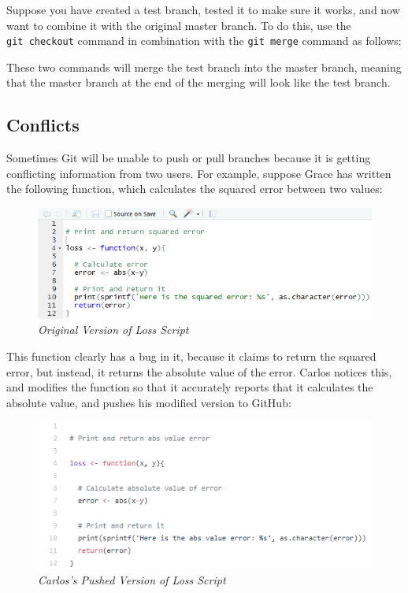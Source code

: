 \documentclass[]{book}
\newenvironment{Shaded}{\begin{snugshade}}{\end{snugshade}}
\newcommand{\StringTok}[1]{\textcolor[rgb]{0.31,0.60,0.02}{#1}}
\newcommand{\OperatorTok}[1]{\textcolor[rgb]{0.81,0.36,0.00}{\textbf{#1}}}
\newcommand{\NormalTok}[1]{#1}
\begin{document}
Suppose you have created a test branch, tested it to make sure it works,
and now want to combine it with the original master branch. To do this,
use the \texttt{git\ checkout} command in combination with the
\texttt{git\ merge} command as follows:

\begin{Shaded}
\end{Shaded}

These two commands will merge the test branch into the master branch,
meaning that the master branch at the end of the merging will look like
the test branch.

\subsection{Conflicts}\label{conflicts}

Sometimes Git will be unable to push or pull branches because it is
getting conflicting information from two users. For example, suppose
Grace has written the following function, which calculates the squared
error between two values:

\begin{figure}
\centering
\includegraphics{images/loss0.PNG}
\caption{\emph{Original Version of Loss Script}}
\end{figure}

This function clearly has a bug in it, because it claims to return the
squared error, but instead, it returns the absolute value of the error.
Carlos notices this, and modifies the function so that it accurately
reports that it calculates the absolute value, and pushes his modified
version to GitHub:

\begin{figure}
\centering
\includegraphics{images/lossCarlos.PNG}
\caption{\emph{Carlos's Pushed Version of Loss Script}}
\end{figure}
\end{document}
